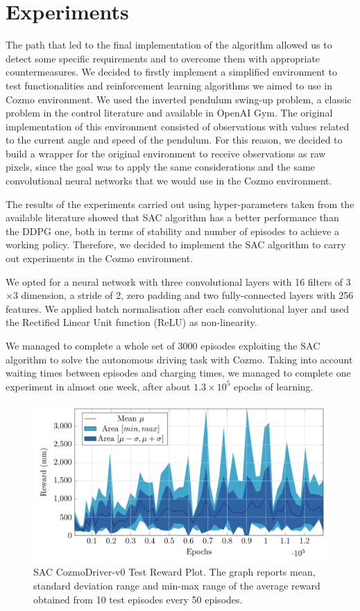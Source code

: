 \documentclass[10pt,twocolumn,letterpaper]{article}
\begin{document}
\section{Experiments}

The path that led to the final implementation of the algorithm allowed us to detect some specific requirements and to overcome them with appropriate countermeasures.
We decided to firstly implement a simplified environment to test functionalities and reinforcement learning algorithms we aimed to use in Cozmo environment.
We used the inverted pendulum swing-up problem, a classic problem in the control literature and available in OpenAI Gym.
The original implementation of this environment consisted of observations with values related to the current angle and speed of the pendulum.
For this reason, we decided to build a wrapper for the original environment to receive observations as raw pixels, since the goal was to apply the same considerations and the same convolutional neural networks that we would use in the Cozmo environment.

The results of the experiments carried out using hyper-parameters taken from the available literature showed that SAC algorithm has a better performance than the DDPG one, both in terms of stability and number of episodes to achieve a working policy.
Therefore, we decided to implement the SAC algorithm to carry out experiments in the Cozmo environment.

We opted for a neural network with three convolutional layers with 16 filters of 3$\times$3 dimension, a stride of 2, zero padding and two fully-connected layers with 256 features.
We applied batch normalisation after each convolutional layer and used the Rectified Linear Unit function (ReLU) as non-linearity.

We managed to complete a whole set of 3000 episodes exploiting the SAC algorithm to solve the autonomous driving task with Cozmo.
Taking into account waiting times between episodes and charging times, we managed to complete one experiment in almost one week, after about $1.3\times 10^5$ epochs of learning.

\begin{figure}[tbp]
    \centering
    \includegraphics[width=0.97\columnwidth]{test_confidence.png}
    \caption[SAC CozmoDriver-v0 Test Reward Plot]{SAC CozmoDriver-v0 Test Reward Plot.
        The graph reports mean, standard deviation range and min-max range of the average reward obtained from 10 test episodes every 50 episodes.}
    \label{confidence}
\end{figure}
\end{document}
